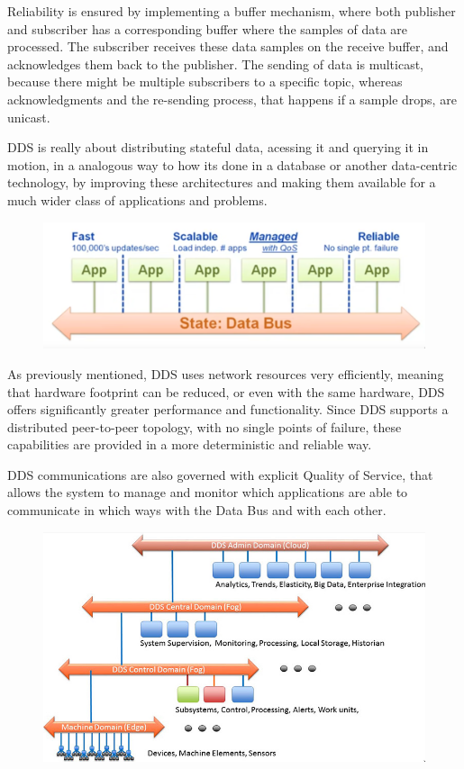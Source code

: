 Reliability is ensured by implementing a buffer mechanism, where both publisher and subscriber has a corresponding buffer where the samples of data are processed. The subscriber receives these data samples on the receive buffer, and acknowledges them back to the publisher. The sending of data is multicast, because there might be multiple subscribers to a specific topic, whereas acknowledgments and the re-sending process, that happens if a sample drops, are unicast. 
                
DDS is really about distributing stateful data, acessing it and querying it in motion, in a analogous way to how its done in a database or another data-centric technology, by improving these architectures and making them available for a much wider class of applications and problems.  
                
\begin{figure}[H]
    \centering
    \includegraphics[width=0.5\linewidth]{images/dds-architecture.png}
\end{figure}

As previously mentioned, DDS uses network resources very efficiently, meaning that hardware footprint can be reduced, or even with the same hardware, DDS offers significantly greater performance and functionality. Since DDS supports a distributed peer-to-peer topology, with no single points of failure, these capabilities are provided in a more deterministic and reliable way.

DDS communications are also governed with explicit Quality of Service, that allows the system to manage and monitor which applications are able to communicate in which ways with the Data Bus and with each other. 

\begin{figure}[H]
    \centering
     \includegraphics[width=0.5\linewidth]{images/dds-scalable-architecture.png}
\end{figure}


